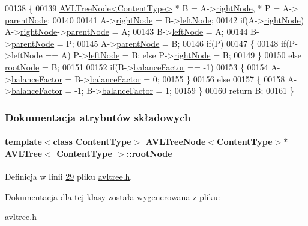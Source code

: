 \begin{DoxyCode}
00138     \{
00139       \hyperlink{class_a_v_l_tree_node}{AVLTreeNode<ContentType>} * B = A->\hyperlink{class_a_v_l_tree_node_a51dfb148f27625c89a3a153760517c38}{rightNode}, * P = A->
      \hyperlink{class_a_v_l_tree_node_ae64d1261fea217d3e85928e7cf2a9151}{parentNode};
00140 
00141       A->\hyperlink{class_a_v_l_tree_node_a51dfb148f27625c89a3a153760517c38}{rightNode} = B->\hyperlink{class_a_v_l_tree_node_afc53d4774f375c23795c9eb598f4d7cd}{leftNode};
00142       \textcolor{keywordflow}{if}(A->\hyperlink{class_a_v_l_tree_node_a51dfb148f27625c89a3a153760517c38}{rightNode}) A->\hyperlink{class_a_v_l_tree_node_a51dfb148f27625c89a3a153760517c38}{rightNode}->\hyperlink{class_a_v_l_tree_node_ae64d1261fea217d3e85928e7cf2a9151}{parentNode} = A;
00143       B->\hyperlink{class_a_v_l_tree_node_afc53d4774f375c23795c9eb598f4d7cd}{leftNode} = A;
00144       B->\hyperlink{class_a_v_l_tree_node_ae64d1261fea217d3e85928e7cf2a9151}{parentNode} = P;
00145       A->\hyperlink{class_a_v_l_tree_node_ae64d1261fea217d3e85928e7cf2a9151}{parentNode} = B;
00146       \textcolor{keywordflow}{if}(P)
00147       \{
00148         \textcolor{keywordflow}{if}(P->leftNode == A) P->\hyperlink{class_a_v_l_tree_node_afc53d4774f375c23795c9eb598f4d7cd}{leftNode} = B; \textcolor{keywordflow}{else} P->\hyperlink{class_a_v_l_tree_node_a51dfb148f27625c89a3a153760517c38}{rightNode} = B;
00149       \}
00150       \textcolor{keywordflow}{else} \hyperlink{class_a_v_l_tree_aee3daa1b05e59d770a95e1274f09eb22}{rootNode} = B;
00151 
00152       \textcolor{keywordflow}{if}(B->\hyperlink{class_a_v_l_tree_node_a212c57dab467b42c3ddc50b2aecc05ad}{balanceFactor} == -1)
00153       \{
00154         A->\hyperlink{class_a_v_l_tree_node_a212c57dab467b42c3ddc50b2aecc05ad}{balanceFactor} = B->\hyperlink{class_a_v_l_tree_node_a212c57dab467b42c3ddc50b2aecc05ad}{balanceFactor} = 0;
00155       \}
00156       \textcolor{keywordflow}{else}
00157       \{
00158         A->\hyperlink{class_a_v_l_tree_node_a212c57dab467b42c3ddc50b2aecc05ad}{balanceFactor} = -1; B->\hyperlink{class_a_v_l_tree_node_a212c57dab467b42c3ddc50b2aecc05ad}{balanceFactor} = 1;
00159       \}
00160       \textcolor{keywordflow}{return} B;
00161     \}
\end{DoxyCode}


\subsubsection{Dokumentacja atrybutów składowych}
\hypertarget{class_a_v_l_tree_aee3daa1b05e59d770a95e1274f09eb22}{
\paragraph[{root\-Node}]{\setlength{\rightskip}{0pt plus 5cm}template$<$class Content\-Type$>$ {\bf A\-V\-L\-Tree\-Node}$<$Content\-Type$>$$\ast$ {\bf A\-V\-L\-Tree}$<$ Content\-Type $>$\-::root\-Node}}\label{class_a_v_l_tree_aee3daa1b05e59d770a95e1274f09eb22}


Definicja w linii \hyperlink{avltree_8h_source_l00029}{29} pliku \hyperlink{avltree_8h_source}{avltree.\-h}.



Dokumentacja dla tej klasy została wygenerowana z pliku\-:\begin{DoxyCompactItemize}
\item 
\hyperlink{avltree_8h}{avltree.\-h}\end{DoxyCompactItemize}
